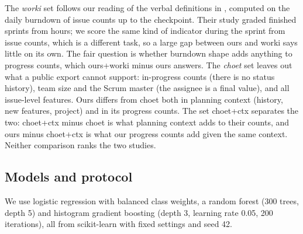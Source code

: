 \documentclass[journal]{IEEEtran}
\begin{document}
The \emph{worki} set follows our reading of the verbal definitions in \cite{perez2024}, computed on the daily burndown of issue counts up to the checkpoint. Their study graded finished sprints from hours; we score the same kind of indicator during the sprint from issue counts, which is a different task, so a large gap between ours and worki says little on its own. The fair question is whether burndown shape adds anything to progress counts, which ours+worki minus ours answers. The \emph{choet} set leaves out what a public export cannot support: in-progress counts (there is no status history), team size and the Scrum master (the assignee is a final value), and all issue-level features. Ours differs from choet both in planning context (history, new features, project) and in its progress counts. The set choet+ctx separates the two: choet+ctx minus choet is what planning context adds to their counts, and ours minus choet+ctx is what our progress counts add given the same context. Neither comparison ranks the two studies.

\subsection{Models and protocol}

We use logistic regression with balanced class weights, a random forest \cite{breiman2001} (300 trees, depth 5) and histogram gradient boosting \cite{friedman2001} (depth 3, learning rate 0.05, 200 iterations), all from scikit-learn \cite{sklearn} with fixed settings and seed 42.
\end{document}
